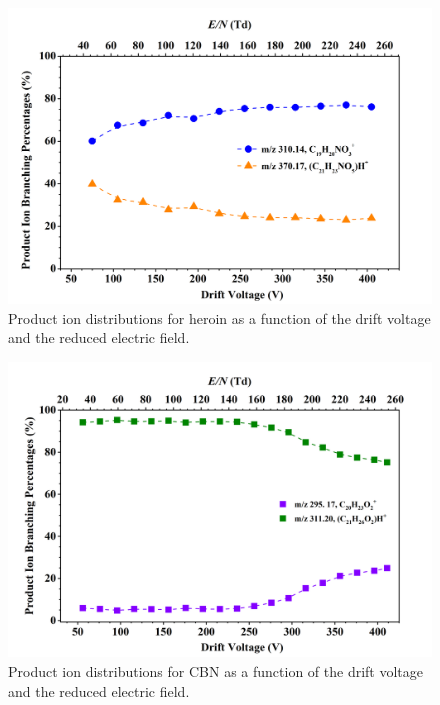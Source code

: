 


\begin{figure}[htb]
\centering
\includegraphics[width=0.80\linewidth]{pics/other_drugs/heroinBRud.png}
\caption{Product ion distributions for heroin as a function of the drift voltage and the reduced electric field.}
\label{fig:DR_CBN}
\end{figure}





\begin{figure}[htb]
\centering
\includegraphics[width=0.80\linewidth]{pics/other_drugs/CBN-br.png}
\caption{Product ion distributions for CBN as a function of the drift voltage and the reduced electric field.}
\label{fig:DR_CBN}
\end{figure}


